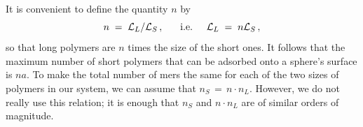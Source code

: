\documentclass[journal=mamobx,manuscript=article]{achemso}
\newcommand{\leng}{\mathcal{L}}
\begin{document}
It is convenient to define the quantity $n$ by \begin{equation}
   \label{eq.ndefn}
    n\;=\;\leng_L/\leng_S  \,,  \hspace{6mm}\hbox{i.e.}
     \hspace{5mm}  \leng_L  \;=\;  n\leng_S \,,
\end{equation}
so that
long polymers are $n$ times the size of the short ones.
It follows that the maximum number of short polymers
that can be adsorbed onto a sphere's surface is $na$.
To make the total %
number of mers the same for each
of the two sizes of polymers in our system,
we can assume that $n_S \,=\, n\cdot n_L$.  However, we do not really use this relation; it is enough that $n_S$ and $n\cdot n_L$
are of similar orders of magnitude.
\end{document}
